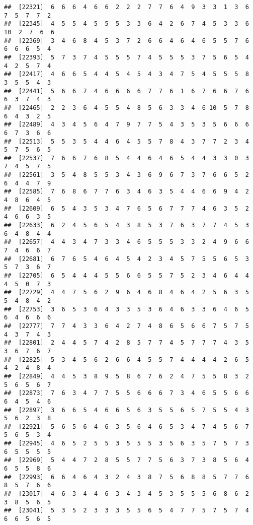 \documentclass[
]{book}
\begin{document}
\begin{verbatim}
##  [22321]  6  6  6  4  6  6  2  2  2  7  7  6  4  9  3  3  1  3  6  7  5  7  7  2
##  [22345]  4  5  5  4  5  5  5  3  3  6  4  2  6  7  4  5  3  3  6 10  2  7  6  6
##  [22369]  3  4  6  8  4  5  3  7  2  6  6  4  6  4  6  5  5  7  6  6  6  6  5  4
##  [22393]  5  7  3  7  4  5  5  5  7  4  5  5  5  3  7  5  6  5  4  4  2  5  7  4
##  [22417]  4  6  6  5  4  4  5  4  5  4  3  4  7  5  4  5  5  5  8  3  5  5  4  3
##  [22441]  5  6  6  7  4  6  6  6  6  7  7  6  1  6  7  6  6  7  6  6  3  7  4  3
##  [22465]  2  2  3  6  4  5  5  4  8  5  6  3  3  4  6 10  5  7  8  6  4  3  2  5
##  [22489]  4  3  4  5  6  4  7  9  7  7  5  4  3  5  3  5  6  6  6  6  7  3  6  6
##  [22513]  5  5  3  5  4  4  6  4  5  5  7  8  4  3  7  7  2  3  4  5  7  5  6  5
##  [22537]  7  6  6  7  6  8  5  4  4  6  4  6  5  4  4  3  3  0  3  7  4  5  7  5
##  [22561]  3  5  4  8  5  5  3  4  3  6  9  6  7  3  7  6  6  5  2  6  4  4  7  9
##  [22585]  7  6  8  6  7  7  6  3  4  6  3  5  4  4  6  6  9  4  2  4  8  6  4  5
##  [22609]  6  5  4  3  5  3  4  7  6  5  6  7  7  7  4  6  3  5  2  4  6  6  3  5
##  [22633]  6  2  4  5  6  5  4  3  8  5  3  7  6  3  7  7  4  5  3  6  4  8  4  4
##  [22657]  4  4  3  4  7  3  3  4  6  5  5  5  3  3  2  4  9  6  6  7  4  6  6  7
##  [22681]  6  7  6  5  4  6  4  5  4  2  3  4  5  7  5  5  6  5  3  5  7  3  6  7
##  [22705]  6  5  4  4  4  5  5  6  6  5  5  7  5  2  3  4  6  4  4  4  5  0  7  3
##  [22729]  4  4  7  5  6  2  9  6  4  6  8  4  6  4  2  5  6  3  5  5  4  8  4  2
##  [22753]  3  6  5  3  6  4  3  3  5  3  6  4  6  3  3  6  4  6  5  6  4  6  6  6
##  [22777]  7  7  4  3  3  6  4  2  7  4  8  6  5  6  6  7  5  7  5  4  3  7  4  3
##  [22801]  2  4  4  5  7  4  2  8  5  7  7  4  5  7  7  7  4  3  5  3  6  7  6  7
##  [22825]  5  3  4  5  6  2  6  6  4  5  5  7  4  4  4  4  2  6  5  4  2  4  8  4
##  [22849]  4  4  5  3  8  9  5  8  6  7  6  2  4  7  5  5  8  3  2  5  6  5  6  7
##  [22873]  7  6  3  4  7  7  5  5  6  6  6  7  3  4  6  5  5  6  6  6  4  5  4  6
##  [22897]  3  6  6  5  4  6  6  5  6  3  5  5  6  5  7  5  5  4  3  5  6  2  3  8
##  [22921]  5  6  5  6  4  6  3  5  6  4  6  5  3  4  7  4  5  6  7  5  6  5  3  4
##  [22945]  4  6  5  2  5  5  3  5  5  5  3  5  6  3  5  7  5  7  3  6  5  5  5  5
##  [22969]  5  4  4  7  2  8  5  5  7  7  5  6  3  7  3  8  5  6  4  6  5  5  8  6
##  [22993]  6  6  4  6  4  3  2  4  3  8  7  5  6  8  8  5  7  7  6  8  5  7  6  6
##  [23017]  4  6  3  4  4  6  3  4  3  4  5  3  5  5  5  6  8  6  2  3  8  5  6  5
##  [23041]  5  3  5  2  3  3  3  5  5  6  5  4  7  7  5  7  5  7  4  6  6  5  6  5

\end{verbatim}
\end{document}
